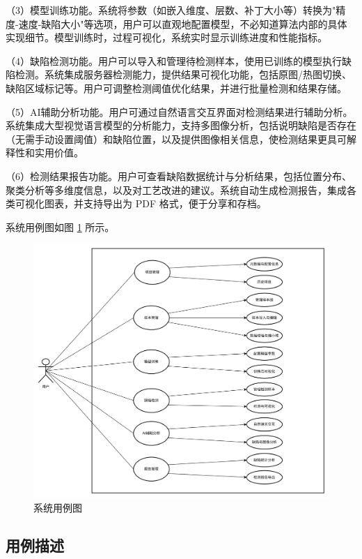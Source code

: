 \documentclass[
  ]{njuthesis}
\begin{document}
（3）模型训练功能。系统将参数（如嵌入维度、层数、补丁大小等）转换为"精度-速度-缺陷大小"等选项，用户可以直观地配置模型，不必知道算法内部的具体实现细节。模型训练时，过程可视化，系统实时显示训练进度和性能指标。

（4）缺陷检测功能。用户可以导入和管理待检测样本，使用已训练的模型执行缺陷检测。系统集成服务器检测能力，提供结果可视化功能，包括原图/热图切换、缺陷区域标记等。用户可调整检测阈值优化结果，并进行批量检测和结果存储。

（5）AI辅助分析功能。用户可通过自然语言交互界面对检测结果进行辅助分析。系统集成大型视觉语言模型的分析能力，支持多图像分析，包括说明缺陷是否存在（无需手动设置阈值）和缺陷位置，以及提供图像相关信息，使检测结果更具可解释性和实用价值。

（6）检测结果报告功能。用户可查看缺陷数据统计与分析结果，包括位置分布、聚类分析等多维度信息，以及对工艺改进的建议。系统自动生成检测报告，集成各类可视化图表，并支持导出为 PDF 格式，便于分享和存档。

系统用例图如图 \ref{系统用例图} 所示。

\begin{figure}[htb]
    \centering
    \includegraphics[width=\textwidth]{images/用例图.png}
    \caption{系统用例图}
    \label{系统用例图}
\end{figure}

\subsection{用例描述}
\end{document}
